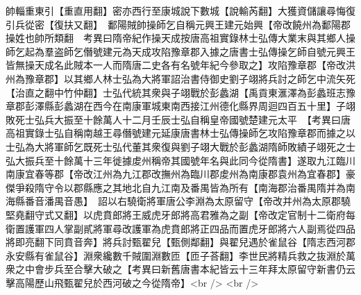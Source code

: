 帥輜重東引【重直用翻】密亦西行至康城說下數城【說輸芮翻】大獲資儲讓尋悔復引兵從密【復扶又翻】　鄱陽賊帥操師乞自稱元興王建元始興【帝改饒州為鄱陽郡操姓也帥所類翻　考異曰隋帝紀作操天成按唐高祖實錄林士弘傳大業末與其鄉人操師乞起為羣盗師乞僭號建元為天成攻陷豫章郡入據之唐書士弘傳操乞師自號元興王皆無操天成名此賊本一人而隋唐二史各有名號年紀今參取之】攻陷豫章郡【帝改洪州為豫章郡】以其鄉人林士弘為大將軍詔治書侍御史劉子翊將兵討之師乞中流矢死【治直之翻中竹仲翻】士弘代統其衆與子翊戰於彭蠡湖【禹貢東滙澤為彭蠡班志豫章郡彭澤縣彭蠡湖在西今在南康軍城東南西接江州德化縣界周迴四百五十里】子翊敗死士弘兵大振至十餘萬人十二月壬辰士弘自稱皇帝國號楚建元太平　【考異曰唐高祖實錄士弘自稱南越王尋僭號建元延康唐書林士弘傳操師乞攻陷豫章郡而據之以士弘為大將軍師乞既死士弘代董其衆復與劉子翊大戰於彭蠡湖隋師敗績子翊死之士弘大振兵至十餘萬十三年徙據䖍州稱帝其國號年名與此同今從隋書】遂取九江臨川南康宜春等郡【帝改江州為九江郡改撫州為臨川郡䖍州為南康郡袁州為宜春郡】豪傑爭殺隋守令以郡縣應之其地北自九江南及番禺皆為所有【南海郡治番禺隋并為南海縣番音潘禺音愚】　詔以右驍衛將軍唐公李淵為太原留守【帝改并州為太原郡驍堅堯翻守式又翻】以虎賁郎將王威虎牙郎將高君雅為之副【帝改定官制十二衛府每衛置護軍四人掌副貳將軍尋改護軍為虎賁郎將正四品而置虎牙郎將六人副焉從四品將即亮翻下同賁音奔】將兵討甄翟兒【甄側鄰翻】與翟兒遇於雀鼠谷【隋志西河郡永安縣有雀鼠谷】淵衆纔數千賊圍淵數匝【匝子荅翻】李世民將精兵救之抜淵於萬衆之中會步兵至合擊大破之【考異曰新舊唐書本紀皆云十三年拜太原留守新書仍云擊高陽歷山飛甄翟兒於西河破之今從隋帝】<br />
<br />

